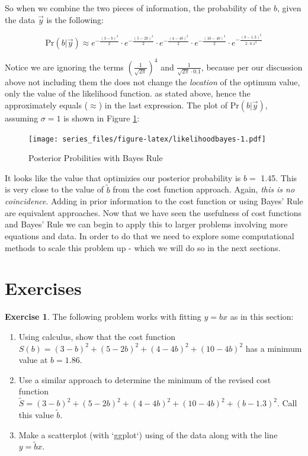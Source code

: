 \documentclass[
]{book}
\theoremstyle{definition}
\theoremstyle{definition}
\theoremstyle{definition}
\newtheorem{exercise}{Exercise}[chapter]
\theoremstyle{remark}
\begin{document}
So when we combine the two pieces of information, the probability of the \(b\), given the data \(\vec{y}\) is the following:

\begin{equation}
\mbox{Pr}(b | \vec{y}) \approx e^{-\frac{(3-b)^{2}}{2}} \cdot e^{-\frac{(5-2b)^{2}}{2}}  \cdot e^{-\frac{(4-4b)^{2}}{2}}  \cdot e^{-\frac{(10-4b)^{2}}{2}} \cdot e^{-\frac{(b-1.3)^{2}}{2 \cdot 0.1^{2}}}
\end{equation}

Notice we are ignoring the terms \(\displaystyle \left( \frac{1}{\sqrt{2 \pi}}\right)^{4}\) and \(\displaystyle \frac{1}{\sqrt{2 \pi} \cdot 0.1}\), because per our discussion above not including them the does not change the \emph{location} of the optimum value, only the value of the likelihood function. as stated above, hence the approximately equals (\(\approx\)) in the last expression. The plot of \(\mbox{Pr}(b | \vec{y})\), assuming \(\sigma = 1\) is shown in Figure \ref{fig:likelihoodbayes}:

\begin{figure}
\centering
\texttt{[image: series\_files/figure-latex/likelihoodbayes-1.pdf]}
\caption{\label{fig:likelihoodbayes}Posterior Probilities with Bayes Rule}
\end{figure}

It looks like the value that optimizies our posterior probability is \(b=\) 1.45. This is very close to the value of \(\tilde{b}\) from the cost function approach. Again, \emph{this is no coincidence}. Adding in prior information to the cost function or using Bayes' Rule are equivalent approaches. Now that we have seen the usefulness of cost functions and Bayes' Rule we can begin to apply this to larger problems involving more equations and data. In order to do that we need to explore some computational methods to scale this problem up - which we will do so in the next sections.

\newpage

\hypertarget{exercises-9}{%
\section{Exercises}\label{exercises-9}}

\begin{exercise}
\protect\hypertarget{exr:unnamed-chunk-177}{}{\label{exr:unnamed-chunk-177} }The following problem works with fitting \(y=bx\) as in this section:

\begin{enumerate}[label=\alph*.]
\item Using calculus, show that the cost function $S(b)=(3-b)^2+(5-2b)^2+(4-4b)^2+(10-4b)^2$ has a minimum value at $b=1.86$.
\item Use a similar approach to determine the minimum of the revised cost function $\tilde{S}=(3-b)^2+(5-2b)^2+(4-4b)^2+(10-4b)^2 + (b-1.3)^2$.  Call this value $\tilde{b}$.
\item Make a scatterplot (with `ggplot`) using of the data along with the line $y=\tilde{b}x$.
\end{enumerate}
\end{exercise}
\end{document}
